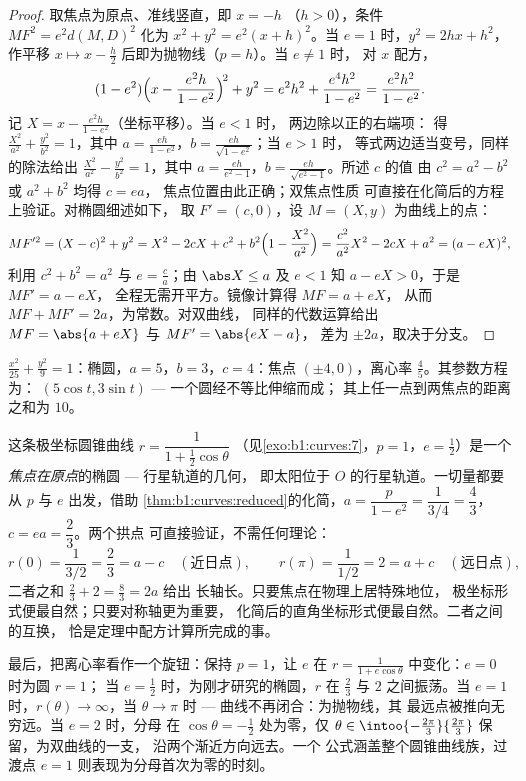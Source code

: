 \begin{proof}
取焦点为原点、准线竖直，即 $x = -h$
（$h > 0$），条件 $MF^2 = e^2 d(M, D)^2$ 化为 $x^2 + y^2 =
e^2 (x + h)^2$。当 $e = 1$ 时，$y^2 = 2hx + h^2$，
作平移 $x \mapsto x - \frac h2$ 后即为抛物线（$p = h$）。当 $e \neq 1$ 时，
对 $x$ 配方，
\[
(1 - e^2)\Bigl(x - \frac{e^2 h}{1 - e^2}\Bigr)^{\!2} + y^2
= e^2h^2 + \frac{e^4 h^2}{1 - e^2}
= \frac{e^2 h^2}{1 - e^2} .
\]
记 $X = x - \frac{e^2h}{1-e^2}$（坐标平移）。当 $e < 1$ 时，
两边除以正的右端项：
得 $\frac{X^2}{a^2} + \frac{y^2}{b^2} = 1$，其中 $a = \frac{eh}{1 -
e^2}$，$b = \frac{eh}{\sqrt{1-e^2}}$；当 $e > 1$ 时，
等式两边适当变号，同样的除法给出
$\frac{X^2}{a^2} - \frac{y^2}{b^2} = 1$，其中 $a = \frac{eh}{e^2 -
1}$，$b = \frac{eh}{\sqrt{e^2 - 1}}$。所述 $c$ 的值
由 $c^2 = a^2 - b^2$ 或 $a^2 + b^2$ 均得 $c = ea$，
焦点位置由此正确；双焦点性质
可直接在化简后的方程上验证。对椭圆细述如下，
取 $F' = (c, 0)$，设 $M = (X, y)$ 为曲线上的点：
\[
MF'^2 = (X - c)^2 + y^2
= X^2 - 2cX + c^2 + b^2\Bigl(1 - \frac{X^2}{a^2}\Bigr)
= \frac{c^2}{a^2}X^2 - 2cX + a^2
= (a - eX)^2 ,
\]
利用 $c^2 + b^2 = a^2$ 与 $e = \frac ca$；由 $\abs X \leq
a$ 及 $e < 1$ 知 $a - eX > 0$，于是 $MF' = a - eX$，
全程无需开平方。镜像计算得 $MF = a + eX$，
从而 $MF + MF' = 2a$，为常数。对双曲线，
同样的代数运算给出 $MF = \abs{a + eX}$ 与 $MF' = \abs{eX - a}$，
差为 $\pm2a$，取决于分支。
\end{proof}

\begin{example}\label{ex:b1:curves:conicexample}
$\frac{x^2}{25} + \frac{y^2}{9} = 1$：椭圆，$a = 5$，$b = 3$，$c
= 4$：焦点 $(\pm4, 0)$，离心率 $\frac45$。其参数方程为：
$(5\cos t, 3\sin t)$ --- 一个圆经不等比伸缩而成；
其上任一点到两焦点的距离之和为 $10$。
\end{example}

\begin{example}[由极坐标方程读出轨道]
\label{ex:b1:curves:orbit}
这条极坐标圆锥曲线 $r = \dfrac{1}{1 + \frac12\cos\theta}$
（见\cref{exo:b1:curves:7}，$p = 1$，$e = \frac12$）是一个
\emph{焦点在原点}的椭圆 --- 行星轨道的几何，
即太阳位于 $O$ 的行星轨道。一切量都要从
$p$ 与 $e$ 出发，借助
\cref{thm:b1:curves:reduced}的化简，$a = \dfrac{p}{1 - e^2} =
\dfrac{1}{3/4} = \dfrac43$，$c = ea = \dfrac23$。两个拱点
可直接验证，不需任何理论：
\[
r(0) = \frac{1}{3/2} = \frac23 = a - c
\quad (\text{近日点}),
\qquad
r(\pi) = \frac{1}{1/2} = 2 = a + c
\quad (\text{远日点}),
\]
二者之和 $\frac23 + 2 = \frac83 = 2a$ 给出
长轴长。只要焦点在物理上居特殊地位，
极坐标形式便最自然；只要对称轴更为重要，
化简后的直角坐标形式便最自然。二者之间的互换，
恰是定理中配方计算所完成的事。

最后，把离心率看作一个旋钮：保持 $p = 1$，让 $e$ 在 $r
= \frac{1}{1 + e\cos\theta}$ 中变化：$e = 0$ 时为圆 $r = 1$；
当 $e = \frac12$ 时，为刚才研究的椭圆，$r$ 在
$\frac23$ 与 $2$ 之间振荡。当 $e = 1$ 时，$r(\theta) \to \infty$，当 $\theta
\to \pi$ 时 --- 曲线不再闭合：为抛物线，其
最远点被推向无穷远。当 $e = 2$ 时，分母
在 $\cos\theta = -\frac12$ 处为零，仅 $\theta \in
\intoo{-\frac{2\pi}3}{\frac{2\pi}3}$ 保留，为双曲线的一支，
沿两个渐近方向远去。一个
公式涵盖整个圆锥曲线族，过渡点 $e =
1$ 则表现为分母首次为零的时刻。
\end{example}

